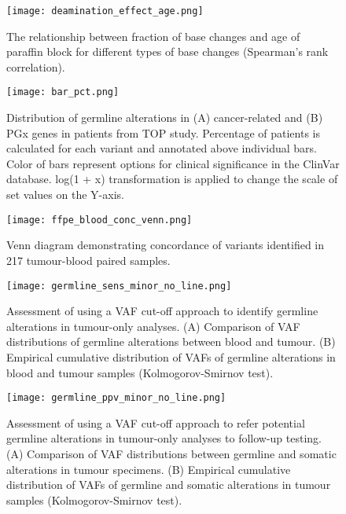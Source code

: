 \documentclass{bmcart}
\begin{document}
\begin{backmatter}
\begin{figure}[!h]
	\centering
	\texttt{[image: deamination\_effect\_age.png]}
	\caption{The relationship between fraction of base changes and age of paraffin block for different types of base changes (Spearman's rank correlation).}
	\label{deamination_effect_age}
\end{figure}

\begin{figure}[!h]
\centering
	\texttt{[image: bar\_pct.png]}
	\caption{Distribution of germline alterations in (A) cancer-related and (B) PGx genes in patients from TOP study. Percentage of patients is calculated for each variant and annotated above individual bars. Color of bars represent options for clinical significance in the ClinVar database. log(1 + x) transformation is applied to change the scale of set values on the Y-axis.}
	\label{bar_pct}
\end{figure}

\begin{figure}[!h]
\centering
	\texttt{[image: ffpe\_blood\_conc\_venn.png]}
	\caption{Venn diagram demonstrating concordance of variants identified in 217 tumour-blood paired samples.}
	\label{ffpe_blood_conc_venn}
\end{figure}

\begin{figure}[!h]
	\texttt{[image: germline\_sens\_minor\_no\_line.png]}
	\caption[Assessment of using a VAF cut-off approach to identify germline alterations in tumour-only analyses.]{Assessment of using a VAF cut-off approach to identify germline alterations in tumour-only analyses. (A) Comparison of VAF distributions of germline alterations between blood and tumour. (B) Empirical cumulative distribution of VAFs of germline alterations in blood and tumour samples (Kolmogorov-Smirnov test).}
	\label{germline_sens_minor}
\end{figure}


\begin{figure}[!h]
	\texttt{[image: germline\_ppv\_minor\_no\_line.png]}
	\caption[Assessment of using a VAF cut-off approach to refer potential germline alterations in tumour-only analyses to follow-up testing.]{Assessment of using a VAF cut-off approach to refer potential germline alterations in tumour-only analyses to follow-up testing. (A) Comparison of VAF distributions between germline and somatic alterations in tumour specimens. (B) Empirical cumulative distribution of VAFs of germline and somatic alterations in tumour samples (Kolmogorov-Smirnov test).}
	\label{germline_ppv_minor}
\end{figure}


\end{backmatter}
\end{document}
